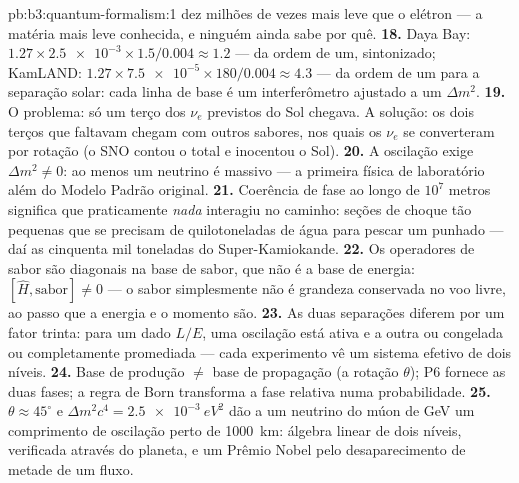 \begin{solution}{pb:b3:quantum-formalism:1}
dez milhões de vezes mais leve que o elétron --- a matéria mais leve
conhecida, e ninguém ainda sabe por quê.
\textbf{18.} Daya Bay: $1.27 \times \num{2.5e-3} \times 1.5/0.004
\approx 1.2$ --- da ordem de um, sintonizado; KamLAND: $1.27 \times
\num{7.5e-5} \times 180/0.004 \approx 4.3$ --- da ordem de um para a
separação solar: cada linha de base é um interferômetro ajustado a um
$\Delta m^2$.
\textbf{19.} O problema: só um terço dos $\nu_e$ previstos do Sol
chegava. A solução: os dois terços que faltavam chegam com outros
sabores, nos quais os $\nu_e$ se converteram por rotação (o SNO contou
o total e inocentou o Sol).
\textbf{20.} A oscilação exige $\Delta m^2 \neq 0$: ao menos um
neutrino é massivo --- a primeira física de laboratório além do Modelo
Padrão original.
\textbf{21.} Coerência de fase ao longo de $10^7$ metros significa que
praticamente \emph{nada} interagiu no caminho: seções de choque tão
pequenas que se precisam de quilotoneladas de água para pescar um
punhado --- daí as cinquenta mil toneladas do Super-Kamiokande.
\textbf{22.} Os operadores de sabor são diagonais na base de sabor, que
não é a base de energia: $[\hat H, \text{sabor}] \neq 0$ --- o sabor
simplesmente não é grandeza conservada no voo livre, ao passo que a
energia e o momento são.
\textbf{23.} As duas separações diferem por um fator trinta: para um
dado $L/E$, uma oscilação está ativa e a outra ou congelada ou
completamente promediada --- cada experimento vê um sistema efetivo de
dois níveis.
\textbf{24.} Base de produção $\neq$ base de propagação (a rotação
$\theta$); P6 fornece as duas fases; a regra de Born transforma a fase
relativa numa probabilidade.
\textbf{25.} $\theta \approx 45^\circ$ e $\Delta m^2c^4 =
\qty{2.5e-3}{eV^2}$ dão a um neutrino do múon de GeV um comprimento de
oscilação perto de \qty{1000}{km}: álgebra linear de dois níveis,
verificada através do planeta, e um Prêmio Nobel pelo desaparecimento
de metade de um fluxo.
\end{solution}
